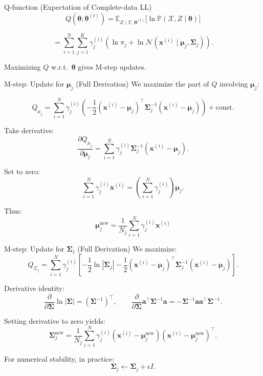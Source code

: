 \documentclass[serif, aspectratio=169]{beamer}
\begin{document}
\begin{frame}{Q-function (Expectation of Complete-data LL)}
\[
Q(\boldsymbol{\theta}; \boldsymbol{\theta}^{(t)})
=
\mathbb{E}_{Z\mid \mathcal{X}, \boldsymbol{\theta}^{(t)}}
\big[
\ln \mathbb{P}(\mathcal{X}, Z \mid \boldsymbol{\theta})
\big]
\]

\[
=
\sum_{i=1}^{N}
\sum_{j=1}^{K}
\gamma_j^{(i)}
\left(
\ln \pi_j
+
\ln 
\mathcal{N}(\mathbf{x}^{(i)} 
\mid
\mathbf{\mu}_j,
\mathbf{\Sigma}_j)
\right).
\]

Maximizing $Q$ w.r.t.\ $\boldsymbol{\theta}$ gives M-step updates.
\end{frame}

\begin{frame}{M-step: Update for $\mathbf{\mu}_j$ (Full Derivation)}
We maximize the part of $Q$ involving $\mathbf{\mu}_j$:

\[
Q_{\mu_j}
=
\sum_{i=1}^{N}
\gamma_j^{(i)}
\left(
-\frac{1}{2}
(\mathbf{x}^{(i)} - \mathbf{\mu}_j)^\top
\mathbf{\Sigma}_j^{-1}
(\mathbf{x}^{(i)} - \mathbf{\mu}_j)
\right)
+ \text{const}.
\]

Take derivative:
\[
\frac{\partial Q_{\mu_j}}{\partial \mathbf{\mu}_j}
=
\sum_{i=1}^{N}
\gamma_j^{(i)}
\mathbf{\Sigma}_j^{-1}
(\mathbf{x}^{(i)} - \mathbf{\mu}_j).
\]

Set to zero:
\[
\sum_{i=1}^{N}
\gamma_j^{(i)}
\mathbf{x}^{(i)}
=
\left(
\sum_{i=1}^{N}
\gamma_j^{(i)}
\right)
\mathbf{\mu}_j.
\]

Thus:
\[
\boxed{
\mathbf{\mu}_j^{\text{new}}
=
\frac{1}{N_j}
\sum_{i=1}^N
\gamma_j^{(i)} \mathbf{x}^{(i)}
}
\]
\end{frame}

\begin{frame}{M-step: Update for $\mathbf{\Sigma}_j$ (Full Derivation)}
We maximize:
\[
Q_{\Sigma_j}
=
\sum_{i=1}^{N}
\gamma_j^{(i)}
\left[
-\frac{1}{2} \ln|\mathbf{\Sigma}_j|
-\frac{1}{2}
(\mathbf{x}^{(i)} - \mathbf{\mu}_j)^\top
\mathbf{\Sigma}_j^{-1}
(\mathbf{x}^{(i)} - \mathbf{\mu}_j)
\right].
\]

Derivative identity:
\[
\frac{\partial}{\partial \mathbf{\Sigma}}
\ln|\mathbf{\Sigma}|
=
(\mathbf{\Sigma}^{-1})^\top, \qquad
\frac{\partial}{\partial \mathbf{\Sigma}}
\mathbf{a}^\top \mathbf{\Sigma}^{-1}\mathbf{a}
=
-
\mathbf{\Sigma}^{-1}
\mathbf{a}\mathbf{a}^\top
\mathbf{\Sigma}^{-1}.
\]

Setting derivative to zero yields:
\[
\boxed{
\mathbf{\Sigma}_j^{\text{new}}
=
\frac{1}{N_j}
\sum_{i=1}^{N}
\gamma_j^{(i)}
(\mathbf{x}^{(i)} - \mathbf{\mu}_j^{\text{new}})
(\mathbf{x}^{(i)} - \mathbf{\mu}_j^{\text{new}})^\top
}.
\]

For numerical stability, in practice:
\[
\mathbf{\Sigma}_j \leftarrow \mathbf{\Sigma}_j + \epsilon I.
\]
\end{frame}
\end{document}

